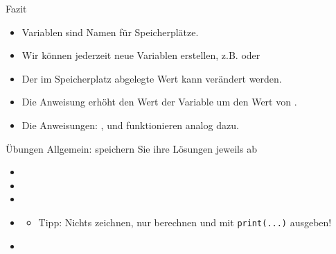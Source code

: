 \begin{frame}{Fazit}
\begin{itemize}
    \item Variablen sind Namen für Speicherplätze.
    \item Wir können jederzeit neue Variablen erstellen, z.B.  oder 
    \item Der im Speicherplatz abgelegte Wert kann verändert werden.
    \item Die Anweisung  erhöht den Wert der Variable  um den Wert von .
    \item Die Anweisungen: \pythoninline{-=}, \pythoninline{*=} und \pythoninline{/=}  funktionieren analog dazu.
\end{itemize}
\end{frame}

\begin{frame}{Übungen}
Allgemein: speichern Sie ihre Lösungen jeweils ab
\begin{itemize}
    \item {}
    \item {}
    \item {}
    \item {}
    \begin{itemize}
    \item Tipp: Nichts zeichnen, nur berechnen und mit \lstinline|print(...)| ausgeben!
    \end{itemize}
    \item {}
\end{itemize}
\end{frame}